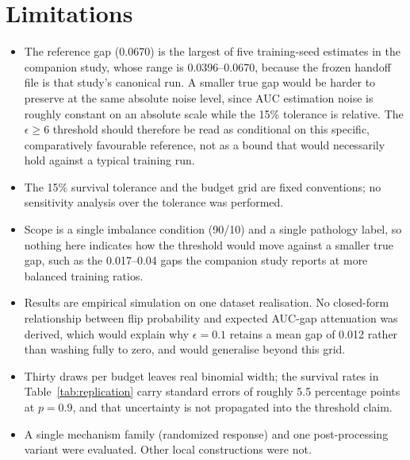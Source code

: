 \documentclass[11pt]{article}
\begin{document}
\section{Limitations}
\begin{itemize}\itemsep0.2em
\item The reference gap (0.0670) is the largest of five training-seed estimates in the companion study, whose range is 0.0396--0.0670, because the frozen handoff file is that study's canonical run. A smaller true gap would be harder to preserve at the same absolute noise level, since AUC estimation noise is roughly constant on an absolute scale while the 15\% tolerance is relative. The $\epsilon \geq 6$ threshold should therefore be read as conditional on this specific, comparatively favourable reference, not as a bound that would necessarily hold against a typical training run.
\item The 15\% survival tolerance and the budget grid are fixed conventions; no sensitivity analysis over the tolerance was performed.
\item Scope is a single imbalance condition (90/10) and a single pathology label, so nothing here indicates how the threshold would move against a smaller true gap, such as the 0.017--0.04 gaps the companion study reports at more balanced training ratios.
\item Results are empirical simulation on one dataset realisation. No closed-form relationship between flip probability and expected AUC-gap attenuation was derived, which would explain why $\epsilon=0.1$ retains a mean gap of 0.012 rather than washing fully to zero, and would generalise beyond this grid.
\item Thirty draws per budget leaves real binomial width; the survival rates in Table~\ref{tab:replication} carry standard errors of roughly 5.5 percentage points at $p=0.9$, and that uncertainty is not propagated into the threshold claim.
\item A single mechanism family (randomized response) and one post-processing variant were evaluated. Other local constructions were not.
\end{itemize}
\end{document}
